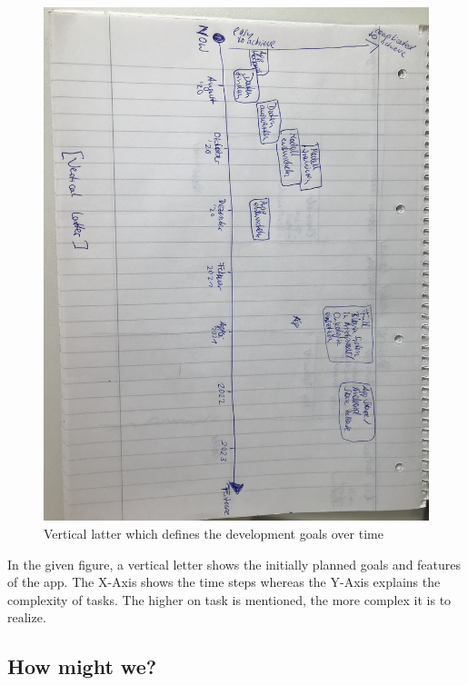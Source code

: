 \begin{figure}[h!]
	\includegraphics[width=1\textwidth]{images/verticallatter.jpg}
	\caption{Vertical latter which defines the development goals over time}
	\label{verticallatter}
\end{figure}

In the given figure, a vertical letter shows the initially planned goals and features of the app. The X-Axis shows the time steps whereas the Y-Axis explains the complexity of tasks. The higher on task is mentioned, the more complex it is to realize.

\subsection{How might we?}

